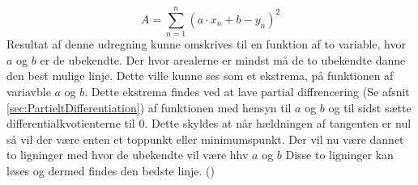 \begin{equation}A = \sum_{n=1}^n (a \cdot x_n + b - y_n)^2\end{equation}
Resultat af denne udregning kunne omskrives til en funktion af to variable, hvor $a$ og $b$ er de ubekendte. Der hvor arealerne er mindst må de to ubekendte danne den best mulige linje. Dette ville kunne ses som et ekstrema, på funktionen af variavble $a$ og $b$. Dette ekstrema findes ved at lave partial diffrencering (Se afsnit \ref{sec:PartieltDifferentiation}) af funktionen med hensyn til $a$ og $b$ og til sidst sætte differentialkvotienterne til 0. Dette skyldes at når hældningen af tangenten er nul så vil der være enten et toppunkt eller minimumspunkt. Der vil nu være dannet to ligninger med hvor de ubekendte vil være hhv $a$ og $b$ Disse to ligninger kan løses og dermed findes den bedste linje. (\cite{webmatematikMindsteKvadratersMetode})


